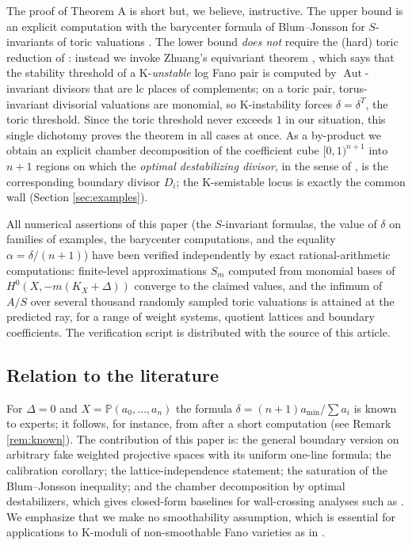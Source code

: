 \documentclass[11pt]{amsart}
\theoremstyle{definition}
\theoremstyle{remark}
\DeclareMathOperator{\Aut}{Aut}
\newcommand{\PP}{\mathbb{P}}
\begin{document}
The proof of Theorem A is short but, we believe, instructive. The upper
bound is an explicit computation with the barycenter formula of
Blum--Jonsson for \(S\)-invariants of toric valuations \cite{BJ20}. The
lower bound \emph{does not} require the (hard) toric reduction of
\cite[Theorem F]{BJ20}: instead we invoke Zhuang's equivariant theorem
\cite{Zhu21}, which says that the stability threshold of a K-\emph{unstable}
log Fano pair is computed by \(\Aut\)-invariant divisors that are lc places
of complements; on a toric pair, torus-invariant divisorial valuations are
monomial, so K-instability forces \(\delta = \delta^T\), the toric
threshold. Since the toric threshold never exceeds \(1\) in our situation,
this single dichotomy proves the theorem in all cases at once. As a
by-product we obtain an explicit chamber decomposition of the coefficient
cube \([0,1)^{n+1}\) into \(n+1\) regions on which the \emph{optimal
destabilizing divisor}, in the sense of \cite{Zhu21,BLXZ25}, is the
corresponding boundary divisor \(D_i\); the K-semistable locus is exactly
the common wall (Section \ref{sec:examples}).

All numerical assertions of this paper (the \(S\)-invariant formulas, the
value of \(\delta\) on families of examples, the barycenter computations,
and the equality \(\alpha=\delta/(n+1)\)) have been verified independently
by exact rational-arithmetic computations: finite-level approximations
\(S_m\) computed from monomial bases of \(H^0(X,-m(K_X+\Delta))\) converge
to the claimed values, and the infimum of \(A/S\) over several thousand
randomly sampled toric valuations is attained at the predicted ray, for a
range of weight systems, quotient lattices and boundary coefficients. The
verification script is distributed with the source of this article.

\subsection*{Relation to the literature} For \(\Delta=0\) and
\(X=\PP(a_0,\dots,a_n)\) the formula
\(\delta = (n+1)a_{\min}/\sum a_i\) is known to experts; it follows,
for instance, from \cite[Corollary 7.19]{BJ20} after a short computation
(see Remark \ref{rem:known}). The contribution of this paper is: the
general boundary version on arbitrary fake weighted projective spaces
with its uniform one-line formula; the calibration corollary; the
lattice-independence statement; the saturation of the Blum--Jonsson
inequality; and the chamber decomposition by optimal destabilizers, which
gives closed-form baselines for wall-crossing analyses such as
\cite{KLW24,ADL24}. We emphasize that we make no smoothability assumption,
which is essential for applications to K-moduli of non-smoothable Fano
varieties as in \cite{KLW24}.
\end{document}
